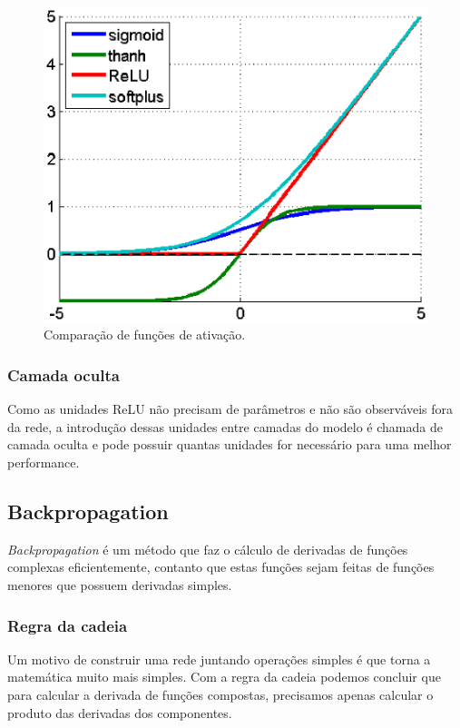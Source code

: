 \begin{figure}[H]
\centering
\includegraphics[scale=0.6]{imagens/activation_funcs.eps}
\caption{Comparação de funções de ativação.}
\label{fig:activation_funcs}
\end{figure}

\subsubsection{Camada oculta}

Como as unidades ReLU não precisam de parâmetros e não são observáveis
fora da rede, a introdução dessas unidades entre camadas do modelo é
chamada de camada oculta e pode possuir quantas unidades for
necessário para uma melhor performance.

\subsection{Backpropagation}

\textit{Backpropagation} é um método que faz o cálculo de derivadas de
funções complexas eficientemente, contanto que estas funções sejam
feitas de funções menores que possuem derivadas simples.

\subsubsection{Regra da cadeia}

Um motivo de construir uma rede juntando operações simples é que torna
a matemática muito mais simples. Com a regra da cadeia podemos
concluir que para calcular a derivada de funções compostas, precisamos
apenas calcular o produto das derivadas dos componentes.

